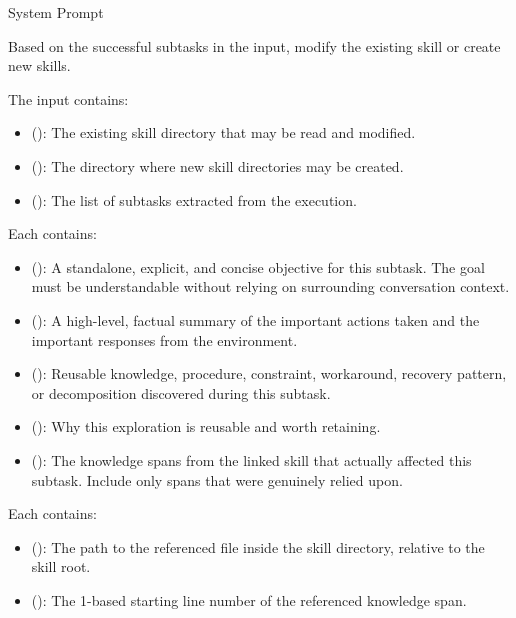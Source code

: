 \begin{svpromptbox}{System Prompt}

\smallskip
Based on the successful subtasks in the input, modify the existing skill or create new skills.\par
\smallskip
{}
\smallskip
The input contains:\par
\smallskip
\begin{itemize}
\item {} (): The existing skill directory that may be read and modified.
\item {} (): The directory where new skill directories may be created.
\item {} (): The list of subtasks extracted from the execution.
\end{itemize}
\smallskip
Each  contains:\par
\smallskip
\begin{itemize}
\item {} (): A standalone, explicit, and concise objective for this subtask. The goal must be understandable without relying on surrounding conversation context.
\item {} (): A high-level, factual summary of the important actions taken and the important responses from the environment.
\item {} (): Reusable knowledge, procedure, constraint, workaround, recovery pattern, or decomposition discovered during this subtask.
\item {} (): Why this exploration is reusable and worth retaining.
\item {} (): The knowledge spans from the linked skill that actually affected this subtask. Include only spans that were genuinely relied upon.
\end{itemize}
\smallskip
Each  contains:\par
\smallskip
\begin{itemize}
\item {} (): The path to the referenced file inside the skill directory, relative to the skill root.
\item {} (): The 1-based starting line number of the referenced knowledge span.

\end{itemize}
\end{svpromptbox}
